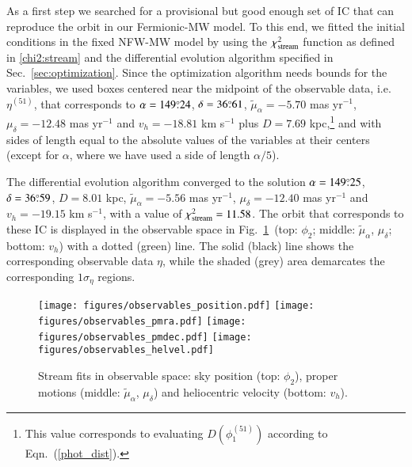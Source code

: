 \documentclass[twocolumn]{aa}
\begin{document}
As a first step we searched for a provisional but good enough set of IC that can reproduce the orbit in our
Fermionic-MW model. To this end, we fitted the initial conditions in the fixed NFW-MW model by using the $\chi^2_{\rm{stream}}$ function as defined in \cref{chi2:stream}
and the differential evolution algorithm specified in Sec.~\ref{sec:optimization}. Since the optimization algorithm
needs bounds for the variables, we used boxes centered near the midpoint
of the observable data, i.e. $\eta^{(51)}$, that corresponds to $\alpha=149\overset{\circ}{.} 24$, $\delta=36\overset{\circ}{.} 61$, $\tilde{\mu}_\alpha=-5.70$ mas yr$^{-1}$, $\mu_\delta=-12.48$ mas yr$^{-1}$ and $v_h=-18.81$ km s$^{-1}$ 
plus $D=7.69$ kpc,\footnote{This value corresponds to evaluating $D(\phi_1^{(51)})$ according to Eqn.~(\ref{phot_dist}).} and with sides of length equal to the absolute values of the variables at their centers (except for $\alpha$, where we have used a side of length $\alpha/5$).

The differential evolution algorithm converged to the solution 
$\alpha=149\overset{\circ}{.} 25$, $\delta=36\overset{\circ}{.} 59$, $D=8.01$ kpc, $\tilde{\mu}_\alpha=-5.56$ mas yr$^{-1}$, $\mu_\delta=-12.40$ mas yr$^{-1}$ and $v_h=-19.15$ km s$^{-1}$, with a value of $\chi^2_{\rm{stream}}= 11.58$.
The orbit that corresponds to these IC is displayed in the observable space in Fig.~\ref{fig:obs_astrometry}~(top: $\phi_2$; middle: $\tilde{\mu}_\alpha$, $\mu_\delta$; bottom: $v_h$) with a dotted (green) line. The solid (black) line shows the corresponding observable data $\eta$, while the shaded (grey) area demarcates the corresponding $1\sigma_\eta$ regions.
\begin{figure}
   \centering
   \texttt{[image: figures/observables\_position.pdf]}
   \texttt{[image: figures/observables\_pmra.pdf]}
   \texttt{[image: figures/observables\_pmdec.pdf]}  
   \texttt{[image: figures/observables\_helvel.pdf]}
   \caption{Stream fits in observable space: sky position (top: $\phi_2$), proper motions (middle: $\tilde{\mu}_\alpha$, $\mu_\delta$) and heliocentric velocity (bottom: $v_h$).}
   \label{fig:obs_astrometry}
\end{figure}
\end{document}
